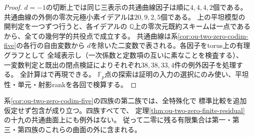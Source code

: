 \begin{proof}
$d=-1$の切断上では同じ三表示の共通曲線因子は順に$4,4,4,2$個である。
共通曲線の外側の零次元極小素イデアルは$20,9,2,5$個である。
上の平坦模型の開判定を一つずつ行うと、各イデアルの
$\mathbb Q$上の零次元既約スキームは一点であるから、全ての幾何学的共役点で成立する。
共通曲線は系\ref{cor:ou-two-zero-codim-five}の各行の自由変数から
$d$を除いた二変数で表される。各因子をtorus上の有理グラフとして
全域表示し（一次係数と定数項の互いに素なことを検査する）、
一変数判定と既出の閉点検証によりそれぞれ$38,38,33,4$件の例外因子を処理する。
全計算はで再現できる。
$\mathbb F_p$点の探索は証明の入力の選択にのみ使い、平坦性・単元・射影rankを各回で検算する。
\end{proof}

\begin{theorem}[二零第二族の全特殊化と十九の共通曲面]
\label{thm:ou-two-zero-second-family}
系\ref{cor:ou-two-zero-codim-five}の四族の第二族では、全特殊化で
標準比較を追加仮定せず包含が成り立つ。四族すべてで、
定理\ref{thm:ou-two-zero-finite-residual}の十九の共通曲面上にも例外はない。
従って二零に残る有限集合は第一・第三・第四族のこれらの曲面の外に含まれる。
\end{theorem}
